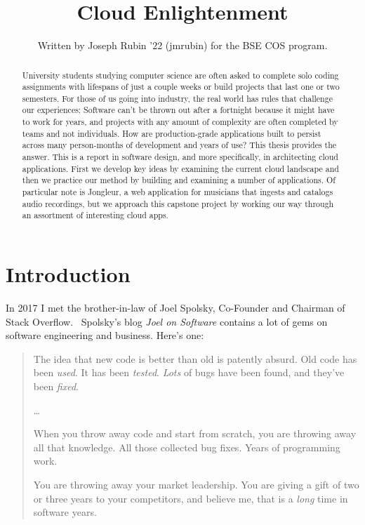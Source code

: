 \documentclass{article}
\begin{document}
\title{Cloud Enlightenment}

\author{Written by Joseph Rubin '22 (jmrubin) for the BSE COS program.}

\date{}
\maketitle

\thispagestyle{empty}


\begin{abstract}
  University students studying computer science are often asked to complete solo coding assignments with lifespans of just a couple weeks or build projects that last one or two semesters.
  For those of us going into industry, the real world has rules that challenge our experiences:
  Software can't be thrown out after a fortnight because it might have to work for years, and projects with any amount of complexity are often completed by teams and not individuals.
  How are production-grade applications built to persist across many person-months of development and years of use?
  This thesis provides the answer.
  This is a report in software design, and more specifically, in architecting cloud applications.
  First we develop key ideas by examining the current cloud landscape and then we practice our method by building and examining a number of applications.
  Of particular note is Jongleur, a web application for musicians that ingests and catalogs audio recordings, but we approach this capstone project by working our way through an assortment of interesting cloud apps.
\end{abstract}

\newpage

\section{Introduction}

In 2017 I met the brother-in-law of Joel Spolsky, Co-Founder and Chairman of Stack Overflow.~\cite{stack-overflow}
Spolsky's blog \textit{Joel on Software} contains a lot of gems on software engineering and business.
Here's one:

\begin{quote}
  The idea that new code is better than old is patently absurd.
  Old code has been \textit{used}.
  It has been \textit{tested}.
  \textit{Lots} of bugs have been found, and they’ve been \textit{fixed}.

  \ldots

  When you throw away code and start from scratch, you are throwing away all that knowledge.
  All those collected bug fixes.
  Years of programming work.

  You are throwing away your market leadership.
  You are giving a gift of two or three years to your competitors, and believe me, that is a \textit{long} time in software years.~\cite{joel-old-code}
\end{quote}
\end{document}
